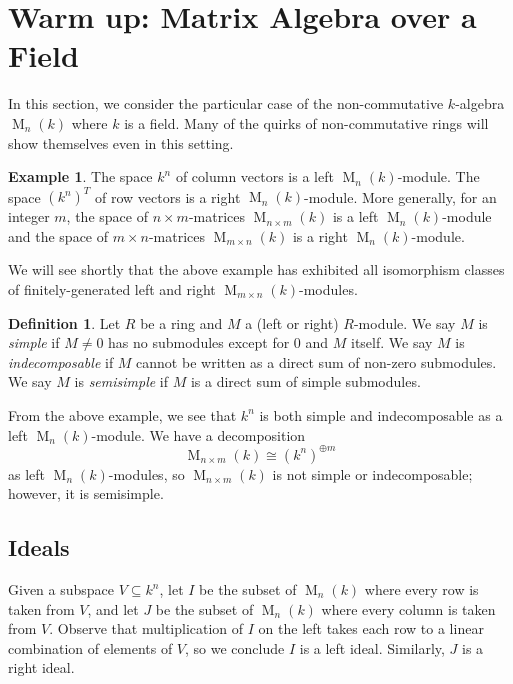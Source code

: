 \documentclass[12pt]{article}
\theoremstyle{plain}
\theoremstyle{definition}
\newtheorem{definition}[theorem]{Definition}
\newtheorem{example}[theorem]{Example}
\theoremstyle{remark}
\numberwithin{equation}{section}
\begin{document}

\section{Warm up: Matrix Algebra over a Field}

In this section, we consider the particular case of the non-commutative
$k$-algebra $\operatorname{M}_n(k)$ where $k$ is a field.
Many of the quirks of non-commutative rings will show themselves even in this
setting.

\begin{example}
The space $k^n$ of column vectors is a left $\operatorname{M}_n(k)$-module.
The space $(k^n)^T$ of row vectors is a right $\operatorname{M}_n(k)$-module.
More generally, for an integer $m$, the space of $n \times m$-matrices
$\operatorname{M}_{n \times m}(k)$ is a left $\operatorname{M}_n(k)$-module
and the space of $m \times n$-matrices
$\operatorname{M}_{m \times n}(k)$ is a right $\operatorname{M}_n(k)$-module.
\end{example}

We will see shortly that the above example has
exhibited all isomorphism classes of finitely-generated
left and right $\operatorname{M}_{m \times n}(k)$-modules.

\begin{definition}
Let $R$ be a ring and $M$ a (left or right) $R$-module.
We say $M$ is \emph{simple} if $M\ne 0$ has no submodules except for
$0$ and $M$ itself.
We say $M$ is \emph{indecomposable} if $M$ cannot be written as a direct sum of
non-zero submodules.
We say $M$ is \emph{semisimple} if $M$ is a direct sum of simple
submodules.
\end{definition}

From the above example, we see that $k^n$ is both simple and
indecomposable as a left $\operatorname{M}_n(k)$-module.
We have a decomposition
\[
\operatorname{M}_{n \times m}(k) \cong (k^n)^{\oplus m}
\]
as left $\operatorname{M}_n(k)$-modules,
so $\operatorname{M}_{n \times m}(k)$ is not simple or
indecomposable; however, it is semisimple.

\subsection{Ideals}

Given a subspace $V \subseteq k^n$, let
$I$ be the subset of $\operatorname{M}_n(k)$
where every row is taken from $V$,
and let $J$ be the subset of $\operatorname{M}_n(k)$
where every column is taken from $V$.
Observe that multiplication of $I$ on the left takes each row to a
linear combination of elements of $V$, so we conclude $I$ is a left
ideal.  Similarly, $J$ is a right ideal.
\end{document}
